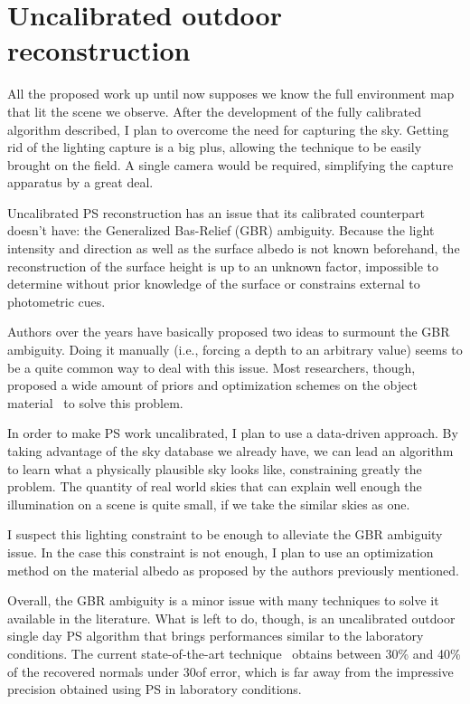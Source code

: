\section{Uncalibrated outdoor reconstruction}
\label{sec:uncalib}

All the proposed work up until now supposes we know the full environment map that lit the scene we observe. After the development of the fully calibrated algorithm described, I plan to overcome the need for capturing the sky. Getting rid of the lighting capture is a big plus, allowing the technique to be easily brought on the field. A single camera would be required, simplifying the capture apparatus by a great deal.

Uncalibrated PS reconstruction has an issue that its calibrated counterpart doesn't have: the Generalized Bas-Relief (GBR) ambiguity. Because the light intensity and direction as well as the surface albedo is not known beforehand, the reconstruction of the surface height is up to an unknown factor, impossible to determine without prior knowledge of the surface or constrains external to photometric cues.

Authors over the years have basically proposed two ideas to surmount the GBR ambiguity. Doing it manually (i.e., forcing a depth to an arbitrary value) seems to be a quite common way to deal with this issue. Most researchers, though, proposed a wide amount of priors and optimization schemes on the object material~\cite{tan-cvpr-07,alldrin-cvpr-08,abrams-eccv-12,queau-jmiv-14} to solve this problem.

In order to make PS work uncalibrated, I plan to use a data-driven approach. By taking advantage of the sky database we already have, we can lead an algorithm to learn what a physically plausible sky looks like, constraining greatly the problem. The quantity of real world skies that can explain well enough the illumination on a scene is quite small, if we take the similar skies as one.

I suspect this lighting constraint to be enough to alleviate the GBR ambiguity issue. In the case this constraint is not enough, I plan to use an optimization method on the material albedo as proposed by the authors previously mentioned.

Overall, the GBR ambiguity is a minor issue with many techniques to solve it available in the literature. What is left to do, though, is an uncalibrated outdoor single day PS algorithm that brings performances similar to the laboratory conditions. The current state-of-the-art technique~\cite{jung-cvpr-15} obtains between 30\% and 40\% of the recovered normals under 30\degree of error, which is far away from the impressive precision obtained using PS in laboratory conditions.

